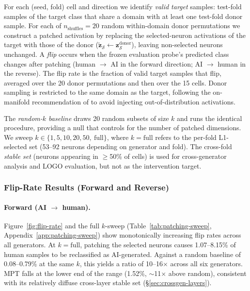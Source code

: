 \documentclass[11pt]{article}
\begin{document}
For each (seed, fold) cell and direction we identify \textit{valid target} samples: test-fold samples of the target class that share a domain with at least one test-fold donor sample. For each of $n_{\text{shuffles}} = 20$ random within-domain donor permutations we construct a patched activation by replacing the selected-neuron activations of the target with those of the donor ($\tilde{\mathbf{z}}_{\mathcal{S}} \!\leftarrow\! \mathbf{z}^{\text{donor}}_{\mathcal{S}}$), leaving non-selected neurons unchanged. A \textit{flip} occurs when the frozen evaluation probe's predicted class changes after patching (human $\to$ AI in the forward direction; AI $\to$ human in the reverse). The flip rate is the fraction of valid target samples that flip, averaged over the 20 donor permutations and then over the 15 cells. Donor sampling is restricted to the same domain as the target, following the on-manifold recommendation of \citet{heimersheim2024patching} to avoid injecting out-of-distribution activations.

The \textit{random-$k$ baseline} draws 20 random subsets of size $k$ and runs the identical procedure, providing a null that controls for the number of patched dimensions. We sweep $k \in \{1, 5, 10, 20, 50,\ \text{full}\}$, where $k = \text{full}$ refers to the per-fold L1-selected set (53--92 neurons depending on generator and fold). The cross-fold \textit{stable set} (neurons appearing in $\geq$50\% of cells) is used for cross-generator analysis and LOGO evaluation, but not as the intervention target.

\subsubsection{Flip-Rate Results (Forward and Reverse)}
\label{sec:patching-results}

\paragraph{Forward (AI $\to$ human).}
Figure~\ref{fig:flip-rate} and the full $k$-sweep (Table~\ref{tab:patching-sweep}, Appendix~\ref{app:patching-sweep}) show monotonically increasing flip rates across all generators. At $k = \text{full}$, patching the selected neurons causes 1.07--8.15\% of human samples to be reclassified as AI-generated. Against a random baseline of 0.08--0.79\% at the same $k$, this yields a ratio of 10--16$\times$ across all six generators. MPT falls at the lower end of the range (1.52\%, $\sim$11$\times$ above random), consistent with its relatively diffuse cross-layer stable set (§\ref{sec:crossgen-layers}).
\end{document}
